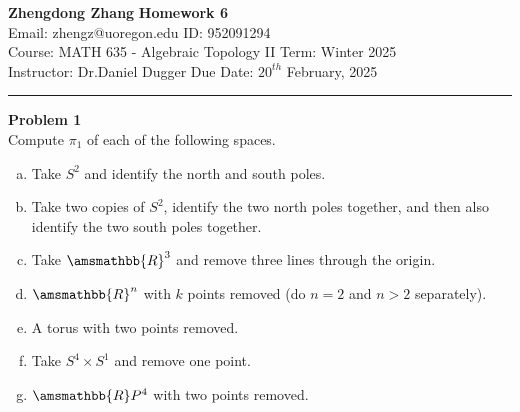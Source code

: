 \documentclass[letterpaper, 12pt]{article}
\newenvironment{problem}[2][Problem]
		{ \begin{mdframed}[backgroundcolor=gray!20] \textbf{#1 #2} \\}
		{  \end{mdframed}}
\renewcommand{\mathbb}{\amsmathbb}
\begin{document}
\noindent
\large\textbf{Zhengdong Zhang} \hfill \textbf{Homework 6}   \\
Email: zhengz@uoregon.edu \hfill ID: 952091294 \\
\normalsize Course: MATH 635 - Algebraic Topology II \hfill Term: Winter 2025\\
Instructor: Dr.Daniel Dugger \hfill Due Date: $20^{th}$ February, 2025 \\
\noindent\rule{7in}{2.8pt}

\begin{problem}{1}
Compute \(\pi_1\) of each of the following spaces. 
\begin{enumerate}[(a)]
\item Take \(S^2\) and identify the north and south poles. 
\item Take two copies of \(S^2\), identify the two north poles together, and then also identify the two south poles together. 
\item Take \(\mathbb{R}^3\) and remove three lines through the origin. 
\item \(\mathbb{R}^n\) with \(k\) points removed (do \(n=2\) and \(n>2\) separately). 
\item A torus with two points removed. 
\item Take \(S^4\times S^1\) and remove one point. 
\item \(\mathbb{R}P^4\) with two points removed.
\end{enumerate}
\end{problem}
\end{document}
